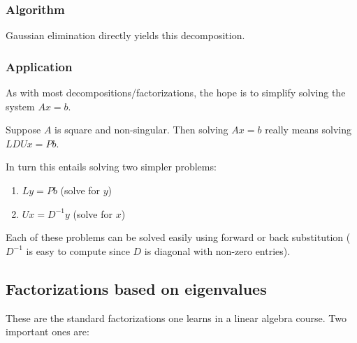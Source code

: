 \subsubsection*{Algorithm}

Gaussian elimination directly yields this decomposition.

\subsubsection*{Application}

As with most decompositions/factorizations, the hope is to simplify solving the system $Ax=b$. 

Suppose $A$ is square and non-singular. Then solving $Ax=b$ really means solving $LDUx = Pb$.

In turn this entails solving two simpler problems: 
\begin{enumerate}[label=(\roman*)]
    \item $Ly = Pb$ (solve for $y$)
    \item $Ux = D^{-1}y$ (solve for $x$)
\end{enumerate} 
Each of these problems can be solved easily using forward or back substitution ($D^{-1}$ is easy to compute since $D$ is diagonal with non-zero entries).

\subsection{Factorizations based on eigenvalues}

These are the standard factorizations one learns in a linear algebra course. Two important ones are:


